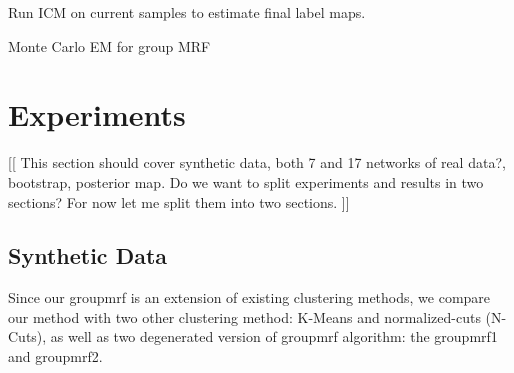 \documentclass[final,authoryear,5p,twocolumn]{elsarticle}
\begin{document}
\begin{algorithm}
  Run ICM on current samples to estimate final label maps.
  \caption{Monte Carlo EM for group MRF}
  \label{alg:alg1}
\end{algorithm}


\section{Experiments}
[[ This section should cover synthetic data, both 7 and 17 networks of real
    data?, bootstrap, posterior map. Do we want to split experiments and results
    in two sections? For now let me split them into two sections. ]] 


\subsection{Synthetic Data}
Since our \textsf{groupmrf} is an extension of existing clustering methods, we
compare our method with two other clustering method: \textsf{K-Means} and
normalized-cuts (\textsf{N-Cuts}), as well as two degenerated version of
\textsf{groupmrf} algorithm: the \textsf{groupmrf1} and \textsf{groupmrf2}.

\end{document}
